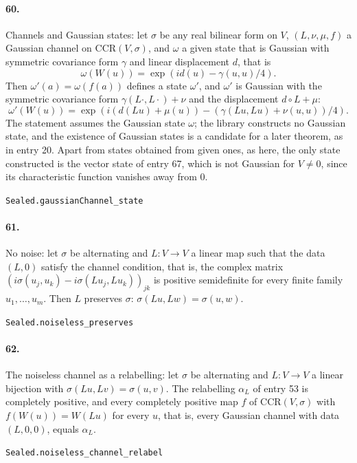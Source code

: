 \documentclass[11pt]{article}
\begin{document}
\paragraph{60.} Channels and Gaussian states: let $\sigma$ be any real bilinear form on $V$, $(L, \nu, \mu, f)$ a Gaussian channel on $\mathrm{CCR}(V, \sigma)$, and $\omega$ a given state that is Gaussian with symmetric covariance form $\gamma$ and linear displacement $d$, that is \[\omega(W(u)) = \exp(i d(u) - \gamma(u, u)/4).\] Then $\omega'(a) = \omega(f(a))$ defines a state $\omega'$, and $\omega'$ is Gaussian with the symmetric covariance form $\gamma(L\cdot, L\cdot) + \nu$ and the displacement $d \circ L + \mu$: \[\omega'(W(u)) = \exp(i (d(Lu) + \mu(u)) - (\gamma(Lu, Lu) + \nu(u, u))/4).\] The statement assumes the Gaussian state $\omega$; the library constructs no Gaussian state, and the existence of Gaussian states is a candidate for a later theorem, as in entry 20. Apart from states obtained from given ones, as here, the only state constructed is the vector state of entry 67, which is not Gaussian for $V \ne 0$, since its characteristic function vanishes away from $0$.\par{\footnotesize\texttt{Sealed.gaussianChannel\_state}}

\paragraph{61.} No noise: let $\sigma$ be alternating and $L : V \to V$ a linear map such that the data $(L, 0)$ satisfy the channel condition, that is, the complex matrix $(i\sigma(u_j, u_k) - i\sigma(Lu_j, Lu_k))_{jk}$ is positive semidefinite for every finite family $u_1, \dots, u_m$. Then $L$ preserves $\sigma$: $\sigma(Lu, Lw) = \sigma(u, w)$.\par{\footnotesize\texttt{Sealed.noiseless\_preserves}}

\paragraph{62.} The noiseless channel as a relabelling: let $\sigma$ be alternating and $L : V \to V$ a linear bijection with $\sigma(Lu, Lv) = \sigma(u, v)$. The relabelling $\alpha_L$ of entry 53 is completely positive, and every completely positive map $f$ of $\mathrm{CCR}(V, \sigma)$ with $f(W(u)) = W(Lu)$ for every $u$, that is, every Gaussian channel with data $(L, 0, 0)$, equals $\alpha_L$.\par{\footnotesize\texttt{Sealed.noiseless\_channel\_relabel}}
\end{document}
